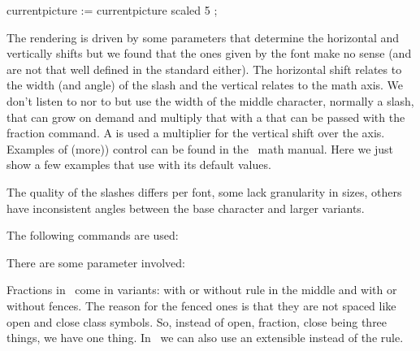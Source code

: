     currentpicture := currentpicture scaled 5 ;
\stopMPcode
\stoplinecorrection

The rendering is driven by some parameters that determine the horizontal and
vertically shifts but we found that the ones given by the font make no sense (and
are not that well defined in the standard either). The horizontal shift relates
to the width (and angle) of the slash and the vertical relates to the math axis.
We don't listen to  nor to  but use the width of the middle character, normally a slash, that can grow
on demand and multiply that with a  that can be passed with the
fraction command. A  is used a multiplier for the vertical shift
over the axis. Examples of (more)) control can be found in the \CONTEXT\ math
manual. Here we just show a few examples that use \type {\vfrac} with its
default values.

\startlinecorrection
{} {}
    {} {}
    {} {}
    {} {}
    {} {}
    {} {}
\stopcombination
\stoplinecorrection

The quality of the slashes differs per font, some lack granularity in sizes,
others have inconsistent angles between the base character and larger variants.

The following commands are used:

\starttyping
\Uskewed
\Uskewedwithdelims
\stoptyping

There are some parameter involved:

\starttyping
\Umathskeweddelimitertolerance
\Umathskewedfractionhgap
\Umathskewedfractionvgap
\stoptyping

\stopsection

\startsection[title=Math fractions]

Fractions in \TEX\ come in variants: with or without rule in the middle and with
or without fences. The reason for the fenced ones is that they are not spaced
like open and close class symbols. So, instead of open, fraction, close being
three things, we have one thing. In \LUAMETATEX\ we can also use an extensible
instead of the rule.

